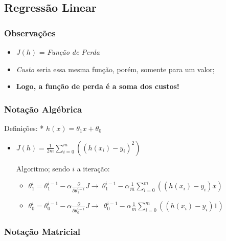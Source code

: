 \documentclass[11pt]{article}
\providecommand{\tightlist}{%
      \setlength{\itemsep}{0pt}\setlength{\parskip}{0pt}}
\begin{document}
    \hypertarget{regressuxe3o-linear}{%
\subsection{\texorpdfstring{\textbf{Regressão
Linear}}{Regressão Linear}}\label{regressuxe3o-linear}}

\hypertarget{observauxe7uxf5es}{%
\subsubsection{Observações}\label{observauxe7uxf5es}}

\begin{itemize}
\item
  \(J(h)\) = \emph{Função de Perda}
\item
  \emph{Custo} seria essa mesma função, porém, somente para um valor;
\item
  \textbf{Logo, a função de perda é a soma dos custos!}
\end{itemize}

\hypertarget{notauxe7uxe3o-alguxe9brica}{%
\subsubsection{Notação Algébrica}\label{notauxe7uxe3o-alguxe9brica}}

Definições: * \(h(x)=\theta_1x+\theta_0\)

\begin{itemize}
\item
  \(J(h)=\frac{1}{2m}\sum\limits_{i=0}^{m}((h(x_i)-y_i)^2)\)

  Algoritmo; sendo \(i\) a iteração:

  \begin{itemize}
  \tightlist
  \item
    \(\theta^i_1= \theta_1^{i-1} - \alpha \frac{\partial}{\partial \theta_1^{i-1}}J \to ~  \theta_1^{i-1} - \alpha \frac{1}{m}\sum\limits_{i=0}^{m}((h(x_i)-y_i)x)\)
  \item
    \(\theta^i_0= \theta_0^{i-1} - \alpha \frac{\partial}{\partial \theta_0^{i-1}}J \to ~  \ \theta_0^{i-1} - \alpha \frac{1}{m}\sum\limits_{i=0}^{m}((h(x_i)-y_i)1)\)
  \end{itemize}
\end{itemize}

\hypertarget{notauxe7uxe3o-matricial}{%
\subsubsection{Notação Matricial}\label{notauxe7uxe3o-matricial}}
\end{document}
